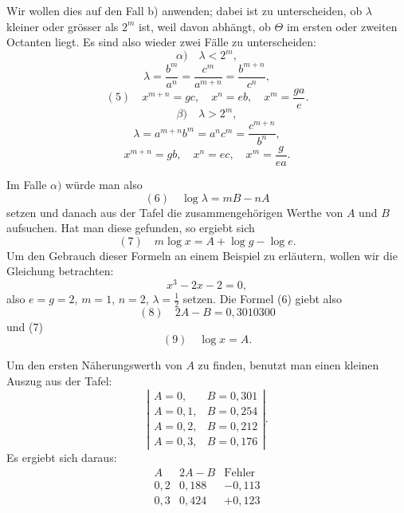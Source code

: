 
Wir wollen dies auf den Fall b) anwenden; dabei ist zu unterscheiden, ob $\lambda$ kleiner oder grösser als $2^m$ ist, weil davon abhängt, ob $\Theta$ im ersten oder zweiten Octanten liegt. Es sind also wieder zwei Fälle zu unterscheiden:
\[
\alpha)\quad \lambda < 2^m,
\]
\[
\lambda = \frac{b^m}{a^n} = \frac{c^m}{a^{m+n}} = \frac{b^{m+n}}{c^n},
\]
\[
(5)\quad x^{m+n} = gc, \quad x^n = eb, \quad x^m = \frac{ga}{e}.
\]
\[
\beta)\quad \lambda > 2^m,
\]
\[
\lambda = a^{m+n}b^m = a^n c^m = \frac{c^{m+n}}{b^n},
\]
\[
x^{m+n} = gb, \quad x^n = ec, \quad x^m = \frac{g}{ea}.
\]

Im Falle $\alpha)$ würde man also
\[
(6)\quad \log\lambda = mB - nA
\]
setzen und danach aus der Tafel die zusammengehörigen Werthe von $A$ und $B$ aufsuchen. Hat man diese gefunden, so ergiebt sich
\[
(7)\quad m\log x = A + \log g - \log e.
\]
Um den Gebrauch dieser Formeln an einem Beispiel zu erläutern, wollen wir die Gleichung betrachten:
\[
x^3 - 2x - 2 = 0,
\]
also $e = g = 2$, $m = 1$, $n = 2$, $\lambda = \frac{1}{2}$ setzen. Die Formel (6) giebt also
\[
(8)\quad 2A - B = 0{,}3010300
\]
und (7)
\[
(9)\quad \log x = A.
\]

Um den ersten Näherungswerth von $A$ zu finden, benutzt man einen kleinen Auszug aus der Tafel:
\[
\left|
\begin{array}{ll}
A = 0, & B = 0{,}301 \\
A = 0{,}1, & B = 0{,}254 \\
A = 0{,}2, & B = 0{,}212 \\
A = 0{,}3, & B = 0{,}176
\end{array}
\right|.
\]
Es ergiebt sich daraus:
\[
\begin{array}{c|c|c}
A & 2A - B & \text{Fehler} \\
\hline
0{,}2 & 0{,}188 & -0{,}113 \\
0{,}3 & 0{,}424 & +0{,}123
\end{array}
\]

